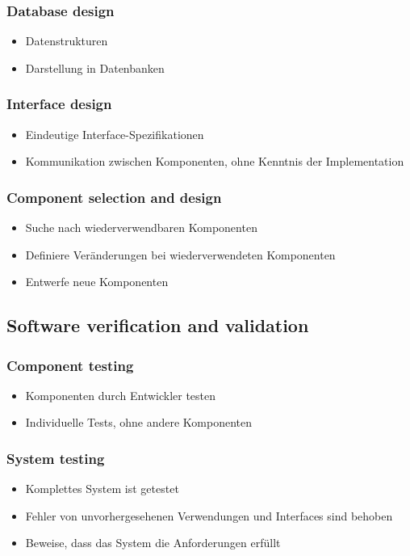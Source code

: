 \subsubsection{Database design}
\begin{itemize}
	\item Datenstrukturen
	\item Darstellung in Datenbanken
\end{itemize}
\subsubsection{Interface design}
\begin{itemize}
	\item Eindeutige Interface-Spezifikationen
	\item Kommunikation zwischen Komponenten, ohne Kenntnis der Implementation
\end{itemize}
\subsubsection{Component selection and design}
\begin{itemize}
	\item Suche nach wiederverwendbaren Komponenten
	\item Definiere Veränderungen bei wiederverwendeten Komponenten
	\item Entwerfe neue Komponenten
\end{itemize}
\subsection{Software verification and validation}
\subsubsection{Component testing}
\begin{itemize}
	\item Komponenten durch Entwickler testen
	\item Individuelle Tests, ohne andere Komponenten
\end{itemize}
\subsubsection{System testing}
\begin{itemize}
	\item Komplettes System ist getestet
	\item Fehler von unvorhergesehenen Verwendungen und Interfaces sind behoben
	\item Beweise, dass das System die Anforderungen erfüllt
\end{itemize}
